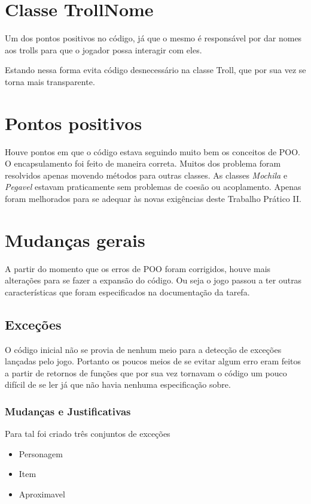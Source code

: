 \documentclass[runningheads,a4paper]{llncs}
\begin{document}
\section{Classe TrollNome}
    Um dos pontos positivos no código, já que o mesmo é responsável por dar nomes aos trolls para que o jogador possa interagir com eles.
    
    Estando nessa forma evita código desnecessário na classe Troll, que por sua vez se torna mais transparente.

\section{Pontos positivos}

	Houve pontos em que o código estava seguindo muito bem os conceitos de POO. O encapsulamento foi feito de maneira correta. Muitos dos problema foram resolvidos apenas movendo métodos para outras classes. As classes \emph{Mochila} e \emph{Pegavel} estavam praticamente sem problemas de coesão ou acoplamento. Apenas foram melhorados para se adequar às novas exigências deste Trabalho Prático II.

\section{Mudanças gerais}

	A partir do momento que os erros de POO foram corrigidos, houve mais alterações para se fazer a expansão do código. Ou seja o jogo passou a ter outras características que foram especificados na documentação da tarefa.

	\subsection{Exceções}
		O código inicial não se provia de nenhum meio para a detecção de exceções lançadas pelo jogo. Portanto os poucos meios de se evitar algum erro eram feitos a partir de retornos de funções que por sua vez tornavam o código um pouco difícil de se ler já que não havia nenhuma especificação sobre.

	\subsubsection{Mudanças e Justificativas}
		Para tal foi criado três conjuntos de exceções
		\begin{itemize}
			\item Personagem
			\item Item
			\item Aproximavel
		\end{itemize}
\end{document}
